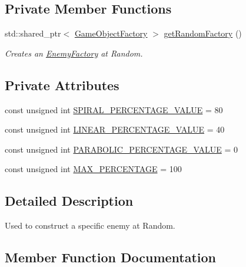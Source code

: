 \subsection*{Private Member Functions}
\begin{DoxyCompactItemize}
\item 
std\+::shared\+\_\+ptr$<$ \hyperlink{class_game_object_factory}{Game\+Object\+Factory} $>$ \hyperlink{class_random_enemy_factory_a8a9643918f3e727aac7e41c6187a9d9a}{get\+Random\+Factory} ()
\begin{DoxyCompactList}\small\item\em Creates an \hyperlink{class_enemy_factory}{Enemy\+Factory} at Random. \end{DoxyCompactList}\end{DoxyCompactItemize}
\subsection*{Private Attributes}
\begin{DoxyCompactItemize}
\item 
const unsigned int \hyperlink{class_random_enemy_factory_ac912e49add9d56e8b12d3881ce1cc656}{S\+P\+I\+R\+A\+L\+\_\+\+P\+E\+R\+C\+E\+N\+T\+A\+G\+E\+\_\+\+V\+A\+L\+UE} = 80
\item 
const unsigned int \hyperlink{class_random_enemy_factory_ad52b65e560c09a560d7be11c97997f5c}{L\+I\+N\+E\+A\+R\+\_\+\+P\+E\+R\+C\+E\+N\+T\+A\+G\+E\+\_\+\+V\+A\+L\+UE} = 40
\item 
const unsigned int \hyperlink{class_random_enemy_factory_a64c95136e3e30f504755037e3f804372}{P\+A\+R\+A\+B\+O\+L\+I\+C\+\_\+\+P\+E\+R\+C\+E\+N\+T\+A\+G\+E\+\_\+\+V\+A\+L\+UE} = 0
\item 
const unsigned int \hyperlink{class_random_enemy_factory_ac3e384acfa1fa3927d3a3643647072e9}{M\+A\+X\+\_\+\+P\+E\+R\+C\+E\+N\+T\+A\+GE} = 100
\end{DoxyCompactItemize}


\subsection{Detailed Description}
Used to construct a specific enemy at Random. 

\subsection{Member Function Documentation}
\mbox{\label{class_random_enemy_factory_a5099fcf010a5cf2f53fd7c874a1925a9}} 
